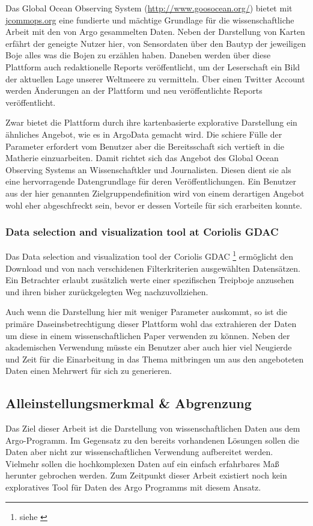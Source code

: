     Das Global Ocean Observing System (\url{http://www.goosocean.org/}) bietet mit \url{jcommops.org} eine fundierte und mächtige Grundlage für die wissenschaftliche Arbeit mit den von Argo gesammelten Daten. Neben der Darstellung von Karten erfährt der geneigte Nutzer hier, von Sensordaten über den Bautyp der jeweiligen Boje alles was die Bojen zu erzählen haben. Daneben werden über diese Plattform auch redaktionelle Reports veröffentlicht, um der Leserschaft ein Bild der aktuellen Lage unserer Weltmeere zu vermitteln. Über einen Twitter Account werden Änderungen an der Plattform und neu veröffentlichte Reports veröffentlicht. 
    
    Zwar bietet die Plattform durch ihre kartenbasierte explorative Darstellung ein ähnliches Angebot, wie es in ArgoData gemacht wird. Die schiere Fülle der Parameter erfordert vom Benutzer aber die Bereitsschaft sich vertieft in die Matherie einzuarbeiten. Damit richtet sich das Angebot des Global Ocean Observing Systems an Wissenschaftkler und Journalisten. Diesen dient sie als eine hervorragende Datengrundlage für deren Veröffentlichungen. Ein Benutzer aus der hier genannten Zielgruppendefinition wird von einem derartigen Angebot wohl eher abgeschfreckt sein, bevor er dessen Vorteile für sich erarbeiten konnte. 
    
    \subsubsection{Data selection and visualization tool at Coriolis GDAC}
    
    Das Data selection and visualization tool der Coriolis GDAC \footnote { siehe \cite{ArgoDataSelection}} ermöglicht den Download und von nach verschidenen Filterkriterien ausgewählten Datensätzen. Ein Betrachter erlaubt zusätzlich werte einer spezifischen Treipboje anzusehen und ihren bisher zurückgelegten Weg nachzuvollziehen.
    
    Auch wenn die Darstellung hier mit weniger Parameter auskommt, so ist die primäre Daseinsbetrechtigung dieser Plattform wohl das extrahieren der Daten um diese in einem wissenschaftlichen Paper verwenden zu können. Neben der akademischen Verwendung müsste ein Benutzer aber auch hier viel Neugierde und Zeit für die Einarbeitung in das Thema mitbringen um aus den angeboteten Daten einen Mehrwert für sich zu generieren. 
    
    
    \subsection{Alleinstellungsmerkmal \& Abgrenzung}
    
    Das Ziel dieser Arbeit ist die Darstellung von wissenschaftlichen Daten aus dem Argo-Programm. Im Gegensatz zu den bereits vorhandenen Lösungen sollen die Daten aber nicht zur wissenschaftlichen Verwendung aufbereitet werden. Vielmehr sollen die hochkomplexen Daten auf ein einfach erfahrbares Maß herunter gebrochen werden. Zum Zeitpunkt dieser Arbeit existiert noch kein exploratives Tool für Daten des Argo Programms mit diesem Ansatz.
    

